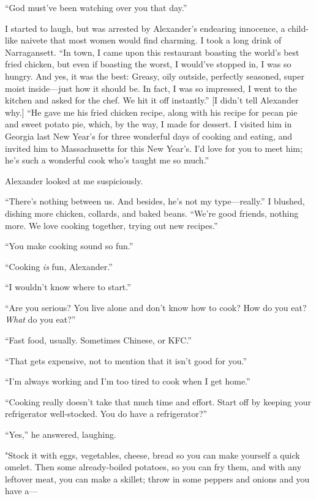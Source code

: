 ``God must've been watching over you that day.''

I started to laugh, but was arrested by Alexander's endearing innocence,
a child-like naivete that most women would find charming. I took a long
drink of Narragansett. ``In town, I came upon this restaurant boasting
the world's best fried chicken, but even if boasting the worst, I
would've stopped in, I was so hungry. And yes, it was the best: Greasy,
oily outside, perfectly seasoned, super moist inside---just how it
should be. In fact, I was so impressed, I went to the kitchen and asked
for the chef. We hit it off instantly.'' {[}I didn't tell Alexander
why.{]} ``He gave me his fried chicken recipe, along with his recipe for
pecan pie and sweet potato pie, which, by the way, I made for dessert. I
visited him in Georgia last New Year's for three wonderful days of
cooking and eating, and invited him to Massachusetts for this New
Year's. I'd love for you to meet him; he's such a wonderful cook who's
taught me so much.''

Alexander looked at me suspiciously.

``There's nothing between us. And besides, he's not my type---really.''
I blushed, dishing more chicken, collards, and baked beans. ``We're good
friends, nothing more. We love cooking together, trying out new
recipes.''

``You make cooking sound so fun.''

``Cooking \emph{is} fun, Alexander.''

``I wouldn't know where to start.''

``Are you serious? You live alone and don't know how to cook? How do you
eat? \emph{What} do you eat?''

``Fast food, usually. Sometimes Chinese, or KFC.''

``That gets expensive, not to mention that it isn't good for you.''

``I'm always working and I'm too tired to cook when I get home.''

``Cooking really doesn't take that much time and effort. Start off by
keeping your refrigerator well-stocked. You do have a refrigerator?''

``Yes,'' he answered, laughing.

"Stock it with eggs, vegetables, cheese, bread so you can make yourself
a quick omelet. Then some already-boiled potatoes, so you can fry them,
and with any leftover meat, you can make a skillet; throw in some
peppers and onions and you have a---

